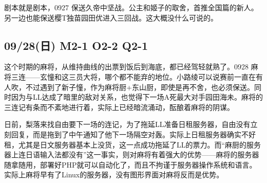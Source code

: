 
剧本就是剧本，0927 保送久帝中坚战。公主和姬子的取舍，首推全国篇的新人。另一边也能保送樱T独苗园田优进入三回战。这大概没什么可说的。

\subsection{09/28(日) M2-1 O2-2 Q2-1}


这个时期的麻将，从维持曲线的出票到饭后到海底，都已经驾轻就熟了。0928 麻将三连——玄憧和这三员大将，哪个都不能弃的地位。小路绫可以说赛前一直在有人吹，不过遇到了新子憧，作为麻将厨+东山厨，即使是再不舍，也必须保送。同时因为与LL达成了暗里的敌对关系，也觉得下一场A死最大对手园田海未。麻将的三连记有条而不紊地进行着，实际上已经暗流涌动，酝酿着麻将的阴谋。

日前，梨落来找自由要下一场的连记，为了拖延LL准备日租服务器，自由没有立刻回复，而是拖到了中午通知了他下一场隔空对轰。实际上日租服务器确实不好租，尤其是日文服务器基本上没货，这一点成功拖延了LL的票力。而“麻厨的服务器上连日语输入法都没有”这一事实，则对麻将有着强大的优势——麻将的服务器随拿随用，部署好PHP就可以自动化了，而且不拘谨于服务器操作系统和语言。实际上麻将早有了Linux的服务器，没有图形界面对麻将反而是优势。

